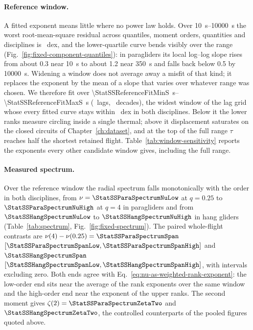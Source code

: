 \paragraph{Reference window.}
A fitted exponent means little where no power law holds. Over
\SIrange{10}{10000}{\second} the worst root-mean-square residual across quantiles,
moment orders, quantities and disciplines is \StatSSFullWorstRmsDex\ dex, and the
lower-quartile curve bends visibly over the range
(Fig.~\ref{fig:fixed-component-quantiles}): in paragliders its local log--log slope
rises from about \num{0.3} near \SI{10}{\second} to about \num{1.2} near
\SI{350}{\second} and falls back below \num{0.5} by \SI{10000}{\second}. Widening a window does not average away a
misfit of that kind; it replaces the exponent by the mean of a slope that varies over
whatever range was chosen. We therefore fit over
\SIrange{\StatSSReferenceFitMinS}{\StatSSReferenceFitMaxS}{\second}
(\StatSSReferenceLagCount\ lags, \StatSSReferenceDecades\ decades), the widest window
of the lag grid whose every fitted curve stays within \StatSSReferenceWorstRmsDex\ dex
in both disciplines. Below it the lower ranks measure circling inside a single thermal;
above it displacement saturates on the closed circuits of Chapter~\ref{ch:dataset},
and at the top of the full range $\tau$ reaches half the shortest retained flight.
Table~\ref{tab:window-sensitivity} reports the exponents every other candidate window
gives, including the full range.

\begin{table}[tb]
 \centering\small
 \caption{Radial contrasts as a function of the fitted lag window, fixed population.
 Each row is the widest window of the lag grid meeting a residual tolerance, with the
 tolerance it actually achieves; the last row is the full range. Both contrasts keep
 their sign at every width, and both shrink towards zero as the window takes in the
 regimes at its ends.}
 \label{tab:window-sensitivity}
 
\end{table}

\paragraph{Measured spectrum.}
Over the reference window the radial spectrum falls monotonically with the order in
both disciplines, from $\nu=\StatSSParaSpectrumNuLow$ at $q=0.25$ to
$\StatSSParaSpectrumNuHigh$ at $q=4$ in paragliders and from
$\StatSSHangSpectrumNuLow$ to $\StatSSHangSpectrumNuHigh$ in hang gliders
(Table~\ref{tab:spectrum}, Fig.~\ref{fig:fixed-spectrum}). The paired whole-flight
contrasts are
$\nu(4)-\nu(0.25)=\StatSSParaSpectrumSpan$
$[\StatSSParaSpectrumSpanLow,\StatSSParaSpectrumSpanHigh]$ and
$\StatSSHangSpectrumSpan$
$[\StatSSHangSpectrumSpanLow,\StatSSHangSpectrumSpanHigh]$, with intervals excluding
zero. Both ends agree with
Eq.~\eqref{eq:nu-as-weighted-rank-exponent}: the low-order end sits near the average of
the rank exponents over the same window and the high-order end near the exponent of the
upper ranks. The second moment gives $\zeta(2)=\StatSSParaSpectrumZetaTwo$ and
$\StatSSHangSpectrumZetaTwo$, the controlled counterparts of the pooled figures quoted
above.

